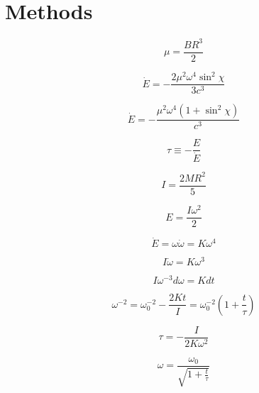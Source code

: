 \chapter{Methods}
\label{ch:methods}

\begin{equation}
	\mu = \frac{BR^3}{2}
\end{equation}

\begin{equation}
	\dot{E} = -\frac{2\mu^2\omega^4 \sin^2 \!\chi}{3c^3}
\end{equation}

\begin{equation}
	\dot{E} = -\frac{\mu^2\omega^4 \left(1 + \sin^2 \!\chi \right)}{c^3}
\end{equation}

\begin{equation}
	\tau \equiv -\frac{E}{\dot{E}}
\end{equation}

\begin{equation}
	I = \frac{2 M R^2}{5}
\end{equation}

\begin{equation}
	E = \frac{I\omega^2}{2}
\end{equation}

\begin{equation}
	\dot{E} = \omega\dot{\omega} = K \omega^4
\end{equation}

\begin{equation}
	I\dot{\omega} = K \omega^3
\end{equation}

\begin{equation}
	I \omega^{-3} d\omega = K dt
\end{equation}

\begin{equation}
	\omega^{-2} = \omega_0^{-2} - \frac{2Kt}{I} = \omega_0^{-2} \left( 1 + \frac{t}{\tau} \right)
\end{equation}

\begin{equation}
	\tau = - \frac{I}{2K\omega^2}
\end{equation}

\begin{equation}
	\omega = \frac{\omega_0}{\sqrt{1 + \frac{t}{\tau}}}
\end{equation}


